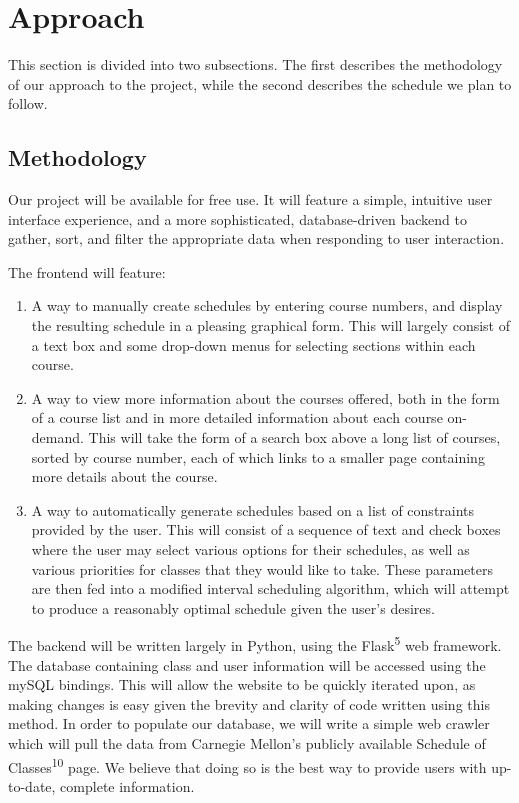 \section{Approach}
This section is divided into two subsections. The first describes the methodology of our approach
to the project, while the second describes the schedule we plan to follow.

\subsection{Methodology}
Our project will be available for free use. It will feature a simple, intuitive user interface experience,
and a more sophisticated, database-driven backend to gather, sort, and filter the appropriate data 
when responding to user interaction.

The frontend will feature:
\begin{enumerate}
\item A way to manually create schedules by entering course numbers, and display the resulting schedule in a 
pleasing graphical form. This will largely consist of a text box and some drop-down menus for selecting 
sections within each course.
\item A way to view more information about the courses offered, both in the form of a course list and in
more detailed information about each course on-demand. This will take the form of a search box above a long 
list of courses, sorted by course number, each of which links to a smaller page containing more details about
the course.
\item A way to automatically generate schedules based on a list of constraints provided by the user. This will
consist of a sequence of text and check boxes where the user may select various options for their schedules,
as well as various priorities for classes that they would like to take. These parameters are then fed into a 
modified interval scheduling algorithm, which will attempt to produce a reasonably optimal schedule given the
user's desires.
\end{enumerate}

The backend will be written largely in Python, using the Flask\textsuperscript{5} web framework. The database containing class
and user information will be accessed using the mySQL bindings. This will allow the website to be quickly
iterated upon, as making changes is easy given the brevity and clarity of code written using this method.
In order to populate our database, we will write a simple web crawler which will pull the data from Carnegie
Mellon's publicly available Schedule of Classes\textsuperscript{10} page. We believe that doing so is the best way to provide
users with up-to-date, complete information.

